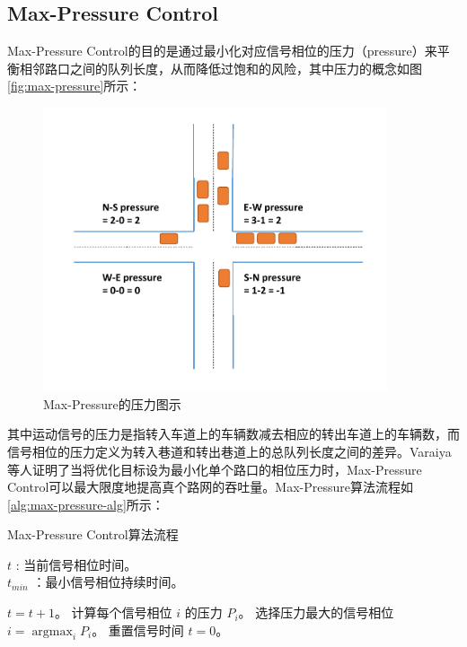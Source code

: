 \subsection{Max-Pressure Control}
Max-Pressure Control的目的是通过最小化对应信号相位的压力（pressure）来平衡相邻路口之间的队列长度，从而降低过饱和的风险，其中压力的概念如图\autoref{fig:max-pressure}所示：
\begin{figure}[htb]
    \includegraphics[width=0.9\textwidth]{fig/max-pressure.pdf}
    \caption{Max-Pressure的压力图示}
    \label{fig:max-pressure}
\end{figure}
其中运动信号的压力是指转入车道上的车辆数减去相应的转出车道上的车辆数，而信号相位的压力定义为转入巷道和转出巷道上的总队列长度之间的差异。Varaiya\cite{varaiya2013max}等人证明了当将优化目标设为最小化单个路口的相位压力时，Max-Pressure Control可以最大限度地提高真个路网的吞吐量。Max-Pressure算法流程如\autoref{alg:max-pressure-alg}所示：
\begin{breakablealgorithm}
    \caption{Max-Pressure Control算法流程}
    \label{alg:max-pressure-alg}
    \begin{algorithmic}[1] %
        \Require 
        $t$ : 当前信号相位时间。\\
        $t_{min}$ ：最小信号相位持续时间。 

        \State $t = t+1$。
        \State 计算每个信号相位 $i$ 的压力 $P_i$。
        \State 选择压力最大的信号相位 $i=\mathop{\arg\max}_i{P_i}$。
        \State 重置信号时间 $t=0$。
        \EndIf
        \EndFor
    \end{algorithmic}  
\end{breakablealgorithm}  

